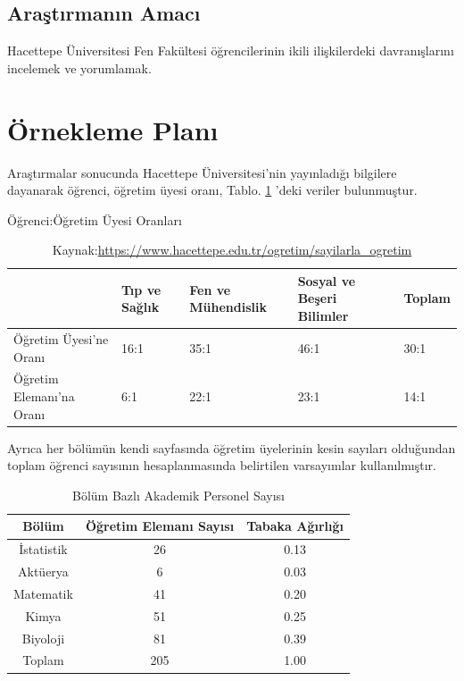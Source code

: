 \documentclass{article}
\begin{document}
\subsection{Araştırmanın Amacı}
Hacettepe Üniversitesi Fen Fakültesi öğrencilerinin ikili ilişkilerdeki davranışlarını incelemek ve yorumlamak.

\section{Örnekleme Planı}
Araştırmalar sonucunda Hacettepe Üniversitesi'nin yayınladığı bilgilere dayanarak öğrenci, öğretim üyesi oranı, Tablo. \ref{tab:Öğrenci:Öğretim Üyesi Oranları} 'deki veriler bulunmuştur.

\begin{table}[h]
    \centering
    \caption{Öğrenci:Öğretim Üyesi Oranları}
    \label{tab:Öğrenci:Öğretim Üyesi Oranları}

    \begin{tabular}{|p{2.1cm}|p{2.1cm}|p{2.1cm}|p{2.1cm}|p{2.1cm}|}
        \hline
         & Tıp ve Sağlık & Fen ve Mühendislik & Sosyal ve Beşeri Bilimler & Toplam \\
        \hline
        Öğretim Üyesi'ne Oranı & 16:1 & 35:1 & 46:1 & 30:1 \\
        \hline
        Öğretim Elemanı'na Oranı & 6:1 & 22:1 & 23:1 & 14:1 \\
        \hline
    \end{tabular}
    \caption*{\footnotesize Kaynak:\url{https://www.hacettepe.edu.tr/ogretim/sayilarla_ogretim}}
\end{table}

Ayrıca her bölümün kendi sayfasında öğretim üyelerinin kesin sayıları olduğundan toplam öğrenci sayısının hesaplanmasında belirtilen varsayımlar kullanılmıştır.

\begin{table}[h]
    \centering
    \caption{Bölüm Bazlı Akademik Personel Sayısı}
    \label{tab:Bölüm Bazlı Veriler}
    
    \begin{tabular}{|c|c|c|}
         \hline
         Bölüm & Öğretim Elemanı Sayısı & Tabaka Ağırlığı\\
         \hline
         İstatistik & 26 & 0.13 \\
         Aktüerya & 6 & 0.03 \\
         Matematik & 41 & 0.20 \\
         Kimya & 51 & 0.25 \\
         Biyoloji & 81 & 0.39 \\
         \hline
         Toplam & 205 & 1.00 \\
         \hline
    \end{tabular}
\end{table}
\end{document}
